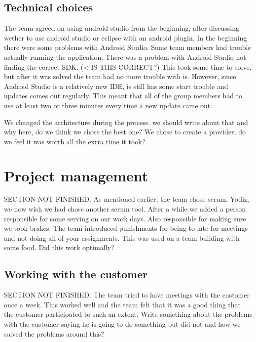 \subsection{Technical choices}
The team agreed on using android studio from the beginning, after discussing wether to use android studio or eclipse with an android plugin. In the beginning there were some problems with Android Studio. Some team members had trouble actually running the application. There was a problem with Android Studio not finding the correct SDK. (<-IS THIS CORRECT?) This took some time to solve, but after it was solved the team had no more trouble with is. However, since Android Studio is a relatively new IDE, is still has some start trouble and updates comes out regularly. This meant that all of the group members had to use at least two or three minutes every time a new update came out. 

We changed the architecture during the process, we should write about that and why here, do we think we chose the best one? We chose to create a provider, do we feel it was worth all the extra time it took? 

\section{Project management}
SECTION NOT FINISHED. As mentioned earlier, the team chose scrum. Yodiz, we now wish we had chose another scrum tool. After a while we added a person responsible for some serving on our work days. Also responsible for making sure we took brakes. 
The team introduced punishments for being to late for meetings and not doing all of your assignments. This was used on a team building with some food. Did this work optimally?
\subsection{Working with the customer}
SECTION NOT FINISHED. The team tried to have meetings with the customer once a week. This worked well and the team felt that it was a good thing that the customer participated to such an extent. Write something about the problems with the customer saying he is going to do something but did not and how we solved the problems around this?

